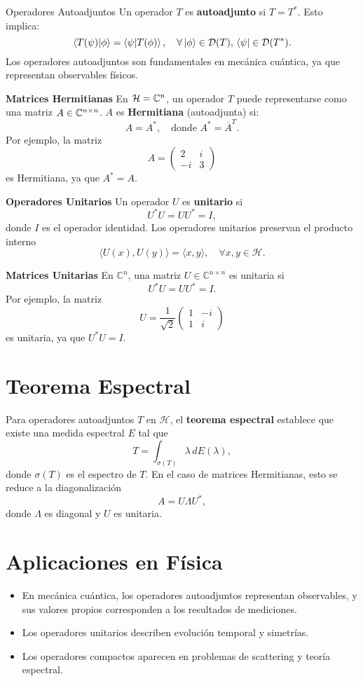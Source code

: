 \documentclass[main.tex]{subfiles}
\begin{document}
\begin{def.}{Operadores Autoadjuntos}
Un operador $T$ es \textbf{autoadjunto} si $T = T^*$. Esto implica:
\[
  \braket{T(\psi)|\phi}=\braket{\psi| T(\phi)}, \quad \forall \ket{\phi} \in \mathcal{D}(T), \, \bra{\psi} \in \mathcal{D}(T^*).
\]
Los operadores autoadjuntos son fundamentales en mecánica cuántica, ya que representan observables físicos.
\end{def.}
\eje\textbf{Matrices Hermitianas}
En $\mathcal{H} = \mathbb{C}^n$, un operador $T$ puede representarse como una matriz $A\in\mathbb C ^{n \times n}$. $A$ es \textbf{Hermitiana} (autoadjunta) si:
\[
A = A^*, \quad \text{donde } A^* = \overline{A}^T.
\]
Por ejemplo, la matriz
\[
A = \begin{pmatrix}
2 & i \\
-i & 3
\end{pmatrix}
\]
es Hermitiana, ya que $A^* = A$.

\eje\textbf{Operadores Unitarios}
Un operador $U$ es \textbf{unitario} si
\[
U^* U = U U^* = I,
\]
donde $I$ es el operador identidad. Los operadores unitarios preservan el producto interno
\[
\langle U(x), U(y) \rangle = \langle x, y \rangle, \quad \forall x, y \in \mathcal{H}.
\]

\eje\textbf{Matrices Unitarias}
En $\mathbb{C}^n$, una matriz $U \in \mathbb{C}^{n \times n}$ es unitaria si
\[
U^* U = U U^* = I.
\]
Por ejemplo, la matriz
\[
U = \frac{1}{\sqrt{2}} \begin{pmatrix}
1 & -i \\
1 & i
\end{pmatrix}
\]
es unitaria, ya que $U^* U = I$.
\section{Teorema Espectral}
Para operadores autoadjuntos $T$ en $\mathcal{H}$, el \textbf{teorema espectral} establece que existe una medida espectral $E$ tal que
\[
T = \int_{\sigma(T)} \lambda \, dE(\lambda),
\]
donde $\sigma(T)$ es el espectro de $T$. En el caso de matrices Hermitianas, esto se reduce a la diagonalización
\[
A = U \Lambda U^*,
\]
donde $\Lambda$ es diagonal y $U$ es unitaria.

\section{Aplicaciones en Física}
\begin{itemize}
    \item En mecánica cuántica, los operadores autoadjuntos representan observables, y sus valores propios corresponden a los resultados de mediciones.
    \item Los operadores unitarios describen evolución temporal y simetrías.
    \item Los operadores compactos aparecen en problemas de scattering y teoría espectral.
\end{itemize}
\end{document}

